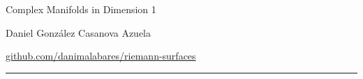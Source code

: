 \documentclass{article}
\numberwithin{equation}{section}
\begin{document}
	\begin{minipage}{\textwidth}
		\begin{minipage}{.5\textwidth}
			Complex Manifolds in Dimension 1\\
		\end{minipage}%
		\begin{minipage}{.5\textwidth}
			\raggedleft
			Daniel González Casanova Azuela\par
			{\small\href{https://github.com/danimalabares/riemann-surfaces}{github.com/danimalabares/riemann-surfaces}}
		\end{minipage}%
	\end{minipage}\vspace{.2cm}\hrule
\section{}\vspace{-.5cm}
\end{document}
